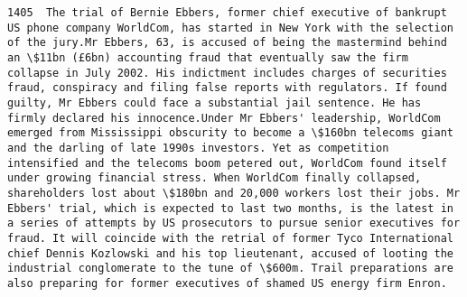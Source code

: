 \documentclass[11pt]{article}
\begin{document}
\begin{Verbatim}[commandchars=\\\{\}]
         1405  The trial of Bernie Ebbers, former chief executive of bankrupt US phone company WorldCom, has started in New York with the selection of the jury.Mr Ebbers, 63, is accused of being the mastermind behind an \$11bn (£6bn) accounting fraud that eventually saw the firm collapse in July 2002. His indictment includes charges of securities fraud, conspiracy and filing false reports with regulators. If found guilty, Mr Ebbers could face a substantial jail sentence. He has firmly declared his innocence.Under Mr Ebbers' leadership, WorldCom emerged from Mississippi obscurity to become a \$160bn telecoms giant and the darling of late 1990s investors. Yet as competition intensified and the telecoms boom petered out, WorldCom found itself under growing financial stress. When WorldCom finally collapsed, shareholders lost about \$180bn and 20,000 workers lost their jobs. Mr Ebbers' trial, which is expected to last two months, is the latest in a series of attempts by US prosecutors to pursue senior executives for fraud. It will coincide with the retrial of former Tyco International chief Dennis Kozlowski and his top lieutenant, accused of looting the industrial conglomerate to the tune of \$600m. Trail preparations are also preparing for former executives of shamed US energy firm Enron.                                                                                                                                                                                                                                                                                                                                                                                                                                                                                                                                                                                                                                                                                                                                                                                                                                                                                                                                                                                                                                                                                                                                                                                                                                                                                                                                                                                                                                                                                                                                                                                                                                                                                                                                                                                         

\end{Verbatim}
\end{document}
